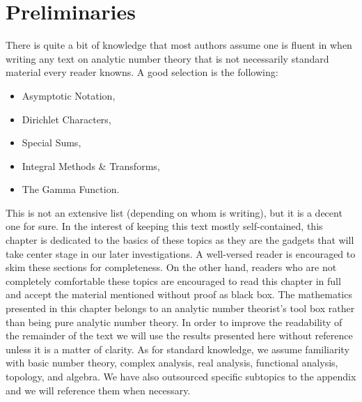   \chapter{Preliminaries}\label{ch:Preliminaries}
    There is quite a bit of knowledge that most authors assume one is fluent in when writing any text on analytic number theory that is not necessarily standard material every reader knowns. A good selection is the following:
    \begin{itemize}
      \item Asymptotic Notation,
      \item Dirichlet Characters,
      \item Special Sums,
      \item Integral Methods \& Transforms,
      \item The Gamma Function.
    \end{itemize}
    This is not an extensive list (depending on whom is writing), but it is a decent one for sure. In the interest of keeping this text mostly self-contained, this chapter is dedicated to the basics of these topics as they are the gadgets that will take center stage in our later investigations. A well-versed reader is encouraged to skim these sections for completeness. On the other hand, readers who are not completely comfortable these topics are encouraged to read this chapter in full and accept the material mentioned without proof as black box. The mathematics presented in this chapter belongs to an analytic number theorist's tool box rather than being pure analytic number theory. In order to improve the readability of the remainder of the text we will use the results presented here without reference unless it is a matter of clarity. As for standard knowledge, we assume familiarity with basic number theory, complex analysis, real analysis, functional analysis, topology, and algebra. We have also outsourced specific subtopics to the appendix and we will reference them when necessary.
